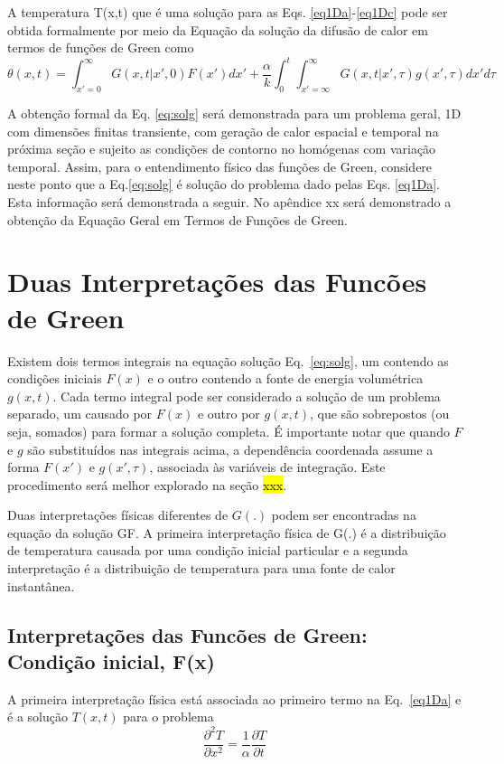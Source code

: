 A temperatura T(x,t) que é uma solução para as Eqs. \ref{eq1Da}-\ref{eq1Dc} pode ser obtida formalmente por meio da Equação da solução da difusão de calor em termos de funções de Green como
\begin{equation}\label{eq:solg}
    \displaystyle \theta(x,t) = \int_{x'=0}^{\infty} G(x,t|x',0) F(x')dx' +
    \frac{\alpha}{k}
    \int_{0}^{t}\int_{x'=\infty}^{\infty}G(x,t|x',\tau)g(x',\tau)dx'd\tau
\end{equation}

A obtenção formal da Eq. \ref{eq:solg} será demonstrada para um problema geral, 1D com dimensões finitas transiente, com geração de calor espacial e temporal na próxima seção e sujeito as condições de contorno no homógenas com variação temporal. Assim, para o entendimento físico das funções de Green, considere neste ponto que a Eq.\ref{eq:solg} é solução do problema dado pelas Eqs. \ref{eq1Da}. Esta informação será demonstrada a seguir. No apêndice xx será demonstrado a obtenção da Equação Geral em Termos de Funções de Green.

\section{Duas Interpretações das Funcões de Green}
Existem dois termos integrais na equação solução  Eq.~\ref{eq:solg}, um contendo as condições iniciais $F(x)$ e o outro contendo a fonte de energia volumétrica $g(x,t)$. Cada termo integral pode ser considerado a solução de um problema separado, um causado por $F(x)$ e outro por $g(x,t)$, que são sobrepostos (ou seja, somados) para formar a solução completa. É importante notar que quando $F$ e $g$ são substituídos nas integrais acima, a dependência coordenada assume a forma $F(x')$ e $g(x',\tau)$, associada às variáveis de integração. Este procedimento será melhor explorado na seção \hl{xxx}.

Duas interpretações físicas diferentes de $G(.)$ podem ser encontradas na equação da solução GF. A primeira interpretação física de G(.) é a distribuição de temperatura causada por uma condição inicial particular e a segunda interpretação é a distribuição de temperatura para uma fonte de calor instantânea.

\subsection{Interpretações das Funcões de Green: Condição inicial, F(x)}
A primeira interpretação física está associada ao primeiro termo na Eq.~\ref{eq1Da}
e é a solução $T(x,t)$ para o problema
\begin{equation}\label{eq1Daa}
    \frac{\partial ^2T}{\partial x^2} = \frac{1}{\alpha}\frac{\partial T}{\partial t} 
\end{equation}

